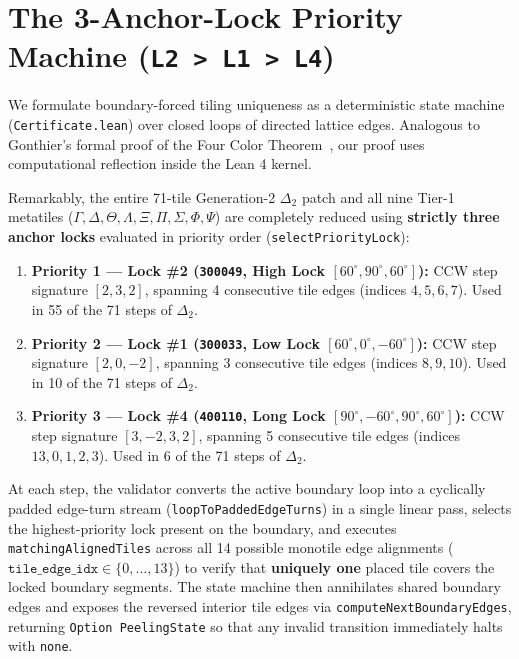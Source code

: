 \documentclass[11pt,a4paper]{article}
\begin{document}
\section{The 3-Anchor-Lock Priority Machine (\texttt{L2 > L1 > L4})}
\label{sec:cascade}
We formulate boundary-forced tiling uniqueness as a deterministic state machine (\texttt{Certificate.lean}) over closed loops of directed lattice edges. Analogous to Gonthier's formal proof of the Four Color Theorem~\cite{gonthier2008four}, our proof uses computational reflection inside the Lean 4 kernel.

Remarkably, the entire 71-tile Generation-2 $\Delta_2$ patch and all nine Tier-1 metatiles ($\Gamma, \Delta, \Theta, \Lambda, \Xi, \Pi, \Sigma, \Phi, \Psi$) are completely reduced using \textbf{strictly three anchor locks} evaluated in priority order (\texttt{selectPriorityLock}):
\begin{enumerate}
\item \textbf{Priority 1 --- Lock \#2 (\texttt{300049}, High Lock $[60^\circ, 90^\circ, 60^\circ]$):} CCW step signature $[2, 3, 2]$, spanning 4 consecutive tile edges (indices $4, 5, 6, 7$). Used in 55 of the 71 steps of $\Delta_2$.
\item \textbf{Priority 2 --- Lock \#1 (\texttt{300033}, Low Lock $[60^\circ, 0^\circ, -60^\circ]$):} CCW step signature $[2, 0, -2]$, spanning 3 consecutive tile edges (indices $8, 9, 10$). Used in 10 of the 71 steps of $\Delta_2$.
\item \textbf{Priority 3 --- Lock \#4 (\texttt{400110}, Long Lock $[90^\circ, -60^\circ, 90^\circ, 60^\circ]$):} CCW step signature $[3, -2, 3, 2]$, spanning 5 consecutive tile edges (indices $13, 0, 1, 2, 3$). Used in 6 of the 71 steps of $\Delta_2$.
\end{enumerate}

At each step, the validator converts the active boundary loop into a cyclically padded edge-turn stream (\texttt{loopToPaddedEdgeTurns}) in a single linear pass, selects the highest-priority lock present on the boundary, and executes \texttt{matchingAlignedTiles} across all 14 possible monotile edge alignments ($\texttt{tile\_edge\_idx} \in \{0, \dots, 13\}$) to verify that \textbf{uniquely one} placed tile covers the locked boundary segments. The state machine then annihilates shared boundary edges and exposes the reversed interior tile edges via \texttt{computeNextBoundaryEdges}, returning \texttt{Option PeelingState} so that any invalid transition immediately halts with \texttt{none}.
\end{document}
